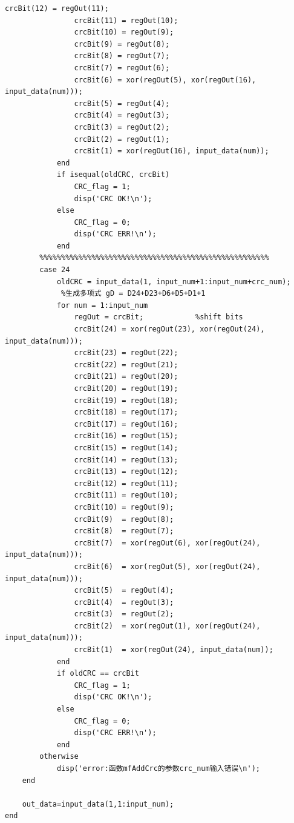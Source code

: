 \documentclass[UTF8]{ctexart}
\begin{document}
\begin{lstlisting}[title=ASK\_DeCRC.m, frame=shadowbox]
                crcBit(12) = regOut(11);
                crcBit(11) = regOut(10);
                crcBit(10) = regOut(9);
                crcBit(9) = regOut(8);
                crcBit(8) = regOut(7);
                crcBit(7) = regOut(6);
                crcBit(6) = xor(regOut(5), xor(regOut(16), input_data(num)));
                crcBit(5) = regOut(4);
                crcBit(4) = regOut(3);
                crcBit(3) = regOut(2);
                crcBit(2) = regOut(1);
                crcBit(1) = xor(regOut(16), input_data(num));
            end
            if isequal(oldCRC, crcBit)
                CRC_flag = 1;
                disp('CRC OK!\n');
            else
                CRC_flag = 0;
                disp('CRC ERR!\n');
            end  
        %%%%%%%%%%%%%%%%%%%%%%%%%%%%%%%%%%%%%%%%%%%%%%%%%%%%%  
        case 24
            oldCRC = input_data(1, input_num+1:input_num+crc_num);
             %生成多项式 gD = D24+D23+D6+D5+D1+1
            for num = 1:input_num
                regOut = crcBit;            %shift bits
                crcBit(24) = xor(regOut(23), xor(regOut(24), input_data(num)));
                crcBit(23) = regOut(22);
                crcBit(22) = regOut(21);
                crcBit(21) = regOut(20);
                crcBit(20) = regOut(19);
                crcBit(19) = regOut(18);
                crcBit(18) = regOut(17);
                crcBit(17) = regOut(16);
                crcBit(16) = regOut(15);	
                crcBit(15) = regOut(14);
                crcBit(14) = regOut(13);
                crcBit(13) = regOut(12);
                crcBit(12) = regOut(11);
                crcBit(11) = regOut(10);
                crcBit(10) = regOut(9);
                crcBit(9)  = regOut(8);
                crcBit(8)  = regOut(7);
                crcBit(7)  = xor(regOut(6), xor(regOut(24), input_data(num)));
                crcBit(6)  = xor(regOut(5), xor(regOut(24), input_data(num)));
                crcBit(5)  = regOut(4);
                crcBit(4)  = regOut(3);
                crcBit(3)  = regOut(2);
                crcBit(2)  = xor(regOut(1), xor(regOut(24), input_data(num)));
                crcBit(1)  = xor(regOut(24), input_data(num)); 
            end 
            if oldCRC == crcBit
                CRC_flag = 1;
                disp('CRC OK!\n');
            else
                CRC_flag = 0;
                disp('CRC ERR!\n');
            end
        otherwise
            disp('error:函数mfAddCrc的参数crc_num输入错误\n');
    end 
           
    out_data=input_data(1,1:input_num);
end
\end{lstlisting}
\end{document}
